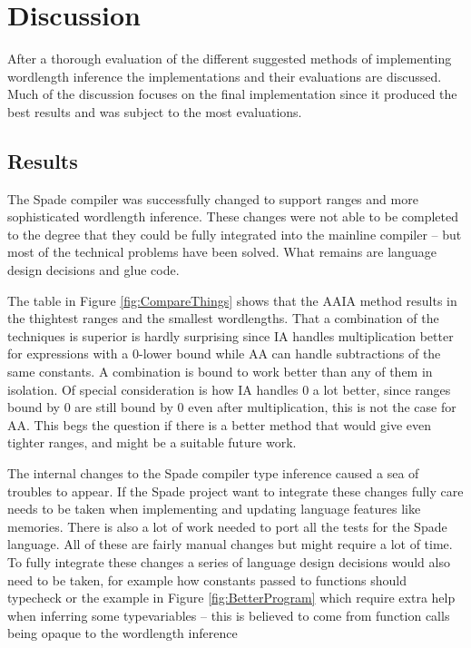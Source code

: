 \chapter{Discussion}
\label{cha:Discussion}
After a thorough evaluation of the different suggested methods of implementing wordlength inference the implementations and their evaluations are discussed. Much of the discussion focuses on the final implementation since it produced the best results and was subject to the most evaluations.

\section{Results}
The Spade compiler was successfully changed to support ranges and more sophisticated wordlength inference. These changes were not able to be completed to the degree that they could be fully integrated into the mainline compiler -- but most of the technical problems have been solved. What remains are language design decisions and glue code.

The table in Figure \ref{fig:CompareThings} shows that the AAIA method results in the thightest ranges and the smallest wordlengths. That a combination of the techniques is superior is hardly surprising since IA handles multiplication better for expressions with a 0-lower bound while AA can handle subtractions of the same constants. A combination is bound to work better than any of them in isolation. Of special consideration is how IA handles $0$ a lot better, since ranges bound by 0 are still bound by $0$ even after multiplication, this is not the case for AA. This begs the question if there is a better method that would give even tighter ranges, and might be a suitable future work.

The internal changes to the Spade compiler type inference caused a sea of troubles to appear. If the Spade project want to integrate these changes fully care needs to be taken when implementing and updating language features like memories. There is also a lot of work needed to port all the tests for the Spade language. All of these are fairly manual changes but might require a lot of time. To fully integrate these changes a series of language design decisions would also need to be taken, for example how constants passed to functions should typecheck or the example in Figure \ref{fig:BetterProgram} which require extra help when inferring some typevariables -- this is believed to come from function calls being opaque to the wordlength inference

